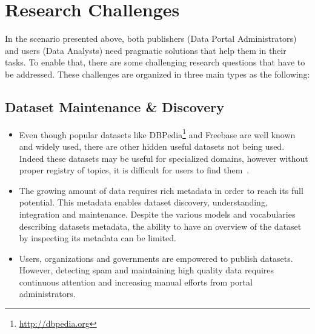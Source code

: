 \section{Research Challenges} \label{sec:challenges}

In the scenario presented above, both publishers (Data Portal Administrators) and users (Data Analysts) need pragmatic solutions that help them in their tasks. To enable that, there are some challenging research questions that have to be addressed. These challenges are organized in three main types as the following:

\subsection{Dataset Maintenance \& Discovery}
\begin{itemize}
\item Even though popular datasets like DBPedia\footnote{\url{http://dbpedia.org}} and Freebase are well known and widely used, there are other hidden useful datasets not being used. Indeed these datasets may be useful for specialized domains, however without proper registry of topics, it is difficult for users to find them~\cite{Lalithsena:WI:13}.
\item The growing amount of data requires rich metadata in order to reach its full potential. This metadata enables dataset discovery, understanding, integration and maintenance. Despite the various models and vocabularies describing datasets metadata, the ability to have an overview of the dataset by inspecting its metadata can be limited.
\item Users, organizations and governments are empowered to publish datasets. However, detecting spam and maintaining high quality data requires continuous attention and increasing manual efforts from portal administrators.
\end{itemize}

